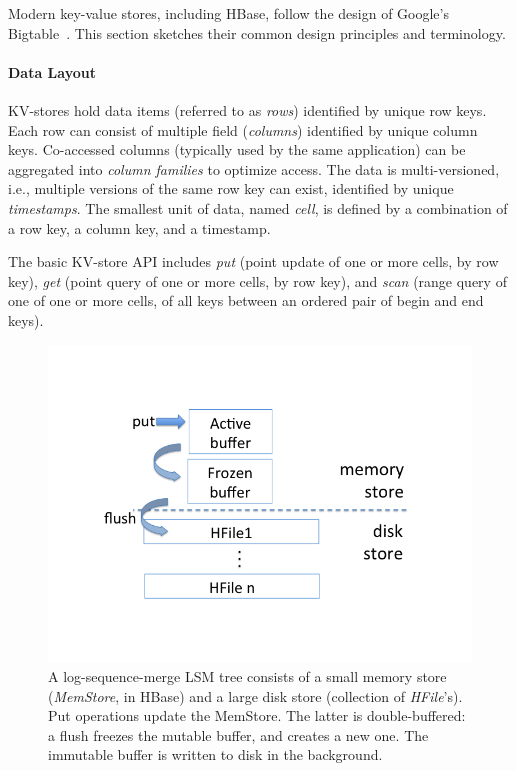 
Modern key-value stores, including HBase, follow the design of Google's Bigtable~\cite{Chang2008}.
This section sketches their common design principles and terminology. 

\paragraph{Data Layout}
KV-stores hold data items (referred to as \emph{rows}) identified by unique 
row keys. Each row can consist of multiple field (\emph{columns}) identified by unique 
column keys. Co-accessed columns (typically used by the same application) can be 
aggregated into  \emph{column families} to optimize access. The data is multi-versioned, 
i.e., multiple versions of the same row key can exist, identified by unique {\em timestamps}. 
The smallest unit of data, named {\em cell}, is defined by a combination of a row key, a
column key, and a timestamp.

The basic KV-store API includes \emph{put} (point update of one or more cells, by row key), 
\emph{get} (point query of one or more cells, by row key), and \emph{scan} (range query of one 
 of one or more cells, of all keys between an ordered pair of begin and end keys). 

\begin{figure}[tb]
\center
\includegraphics[width=\columnwidth, trim={0 2cm 0 2cm}, clip]{LSM} 
\caption{A log-sequence-merge LSM tree consists of a small memory store ({\em MemStore}, in HBase) 
and a large disk store (collection of {\em HFile}'s). Put operations update the MemStore. The latter is 
double-buffered: a flush freezes the mutable buffer, and creates a new one. 
The immutable buffer is written to disk in the background.}
\label{fig:LSM}
\end{figure}

